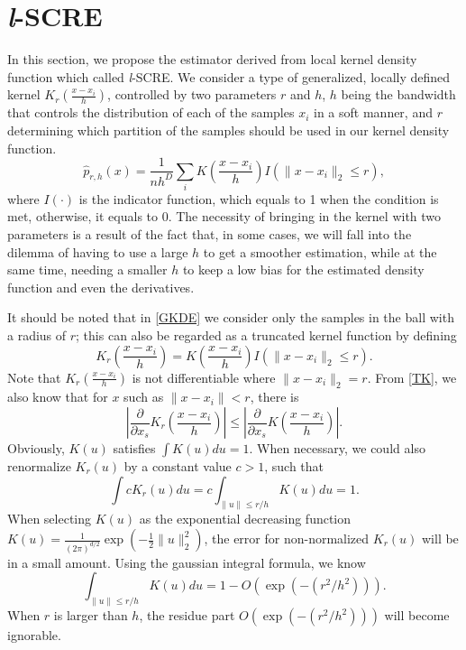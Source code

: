 \documentclass[aos,preprint]{imsart}
\theoremstyle{remark}
\begin{document}
\section{{\it l}-SCRE}
In this section, we propose the estimator derived from local kernel density function which called {\it l}-SCRE.
We consider a type of generalized, locally defined kernel $K_r (\frac{x-x_i}{h})$, controlled by two parameters $r$ and $h$, $h$ being the bandwidth that controls the distribution of each of the samples $x_i$ in a soft manner, and $r$ determining which partition of the samples should be used in our kernel density function.
\begin{equation}\label{GKDE}
\hat{p}_{r, h}(x) = \frac{1}{n h^D}\sum_i K(\frac{x-x_i}{h}) I(\|x -x_i\|_2\leq r),
\end{equation}
where $I(\cdot)$ is the indicator function, which equals to 1 when the condition is met, otherwise, it equals to 0.
The necessity of bringing in the kernel with two parameters is a result of the fact that, in some cases, we will fall into the dilemma of having to use a large $h$ to get a smoother estimation, while at the same time, needing a smaller $h$ to keep a low bias for the estimated density function and even the derivatives.

It should be noted that in \eqref{GKDE} we consider only the samples in the ball with a radius of $r$; this can also be regarded as a truncated kernel function by defining
\begin{equation}\label{TK}
K_r(\frac{x-x_i}{h}) = K(\frac{x-x_i}{h}) I(\|x -x_i\|_2\leq r).
\end{equation}
Note that $K_r(\frac{x-x_i}{h})$ is not differentiable where $\|x-x_i\|_2=r$. From \eqref{TK}, we also know that for $x$ such as $\|x-x_i\|< r$, there is
\begin{equation}\label{DTK}
|\frac{\partial}{\partial x_s} K_r(\frac{x-x_i}{h}) | \leq |\frac{\partial}{\partial x_s} K(\frac{x-x_i}{h})|.
\end{equation}
Obviously, $K(u)$ satisfies $\int K(u)du=1$. When necessary, we could also renormalize $K_r(u)$ by a constant value $c>1$, such that
\[
\int c K_r (u) du =  c\int_{\|u\|\leq r/h} K(u) du= 1.
\]
When selecting $K(u)$ as the exponential decreasing function $K(u) = \frac{1}{{(2\pi)}^{d/2}}\exp(-\frac{1}{2}\|u\|^2_2)$, the error for non-normalized $K_r(u)$ will be in  a small amount. Using the gaussian integral formula, we know 
\begin{equation}\label{Perror}
 \int_{\|u\|\leq r/h} K(u) du =1- O(\exp(-(r^2/h^2))).
\end{equation}
When $r$ is larger than $h$, the residue part $O(\exp(-(r^2/h^2)))$ will become ignorable. %
\end{document}
